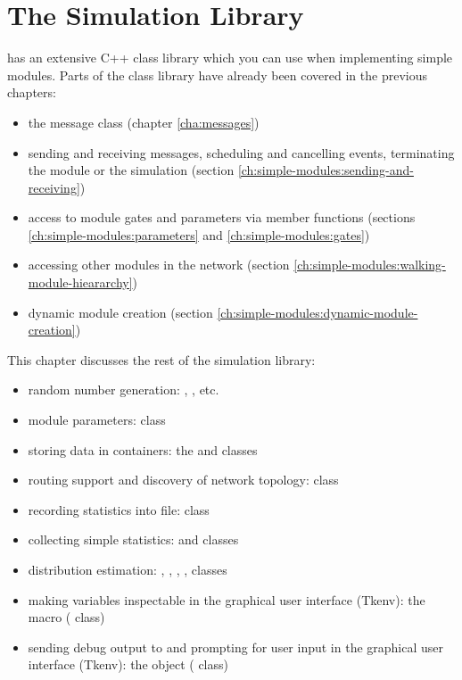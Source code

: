 \chapter{The Simulation Library}
\label{cha:the-simulation-library}

{\opp} has an extensive C++ class library which you can use when implementing
simple modules. Parts of the class library have already been covered in the
previous chapters:

\begin{itemize}
  \item{the message class  (chapter \ref{cha:messages})}
  \item{sending and receiving messages, scheduling and cancelling
    events, terminating the module or the simulation
    (section \ref{ch:simple-modules:sending-and-receiving})}
  \item{access to module gates and parameters via  member functions
    (sections \ref{ch:simple-modules:parameters} and \ref{ch:simple-modules:gates})}
  \item{accessing other modules in the network (section \ref{ch:simple-modules:walking-module-hieararchy})}
  \item{dynamic module creation (section \ref{ch:simple-modules:dynamic-module-creation})}
\end{itemize}

This chapter discusses the rest of the simulation library:

\begin{itemize}
  \item{random number generation: ,
    , etc.}
  \item{module parameters:  class}
  \item{storing data in containers: the  and  classes}
  \item{routing support and discovery of network topology:  class}
  \item{recording statistics into file:  class}
  \item{collecting simple statistics:  and  classes}
  \item{distribution estimation: ,
    , , ,
     classes}
  \item{making variables inspectable in the graphical user interface
    (Tkenv): the  macro ( class)}
  \item{sending debug output to and prompting for user input in the graphical
    user interface (Tkenv): the  object ( class)}
\end{itemize}





